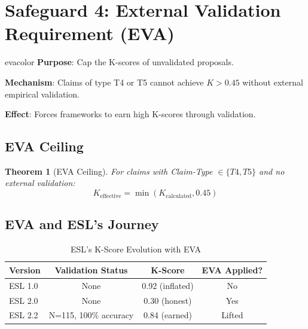 \documentclass[11pt,a4paper]{article}
\newtheorem{theorem}{Theorem}[section]
\theoremstyle{remark}
\begin{document}

\section{Safeguard 4: External Validation Requirement (EVA)}
\label{sec:eva}

\begin{safeguardbox}{evacolor}
\textbf{Purpose}: Cap the K-scores of unvalidated proposals.

\textbf{Mechanism}: Claims of type T4 or T5 cannot achieve $K > 0.45$ without external empirical validation.

\textbf{Effect}: Forces frameworks to earn high K-scores through validation.
\end{safeguardbox}

\subsection{EVA Ceiling}

\begin{theorem}[EVA Ceiling]
\label{thm:eva}
For claims with Claim-Type $\in \{T4, T5\}$ and no external validation:
\begin{equation}
K_{\text{effective}} = \min(K_{\text{calculated}}, 0.45)
\end{equation}
\end{theorem}

\subsection{EVA and ESL's Journey}

\begin{table}[h]
\centering
\caption{ESL's K-Score Evolution with EVA}
\label{tab:eva-journey}
\begin{tabular}{lccc}
\toprule
\textbf{Version} & \textbf{Validation Status} & \textbf{K-Score} & \textbf{EVA Applied?} \\
\midrule
ESL 1.0 & None & 0.92 (inflated) & No \\
ESL 2.0 & None & 0.30 (honest) & Yes \\
ESL 2.2 & N=115, 100\% accuracy & 0.84 (earned) & Lifted \\
\bottomrule
\end{tabular}
\end{table}
\end{document}
